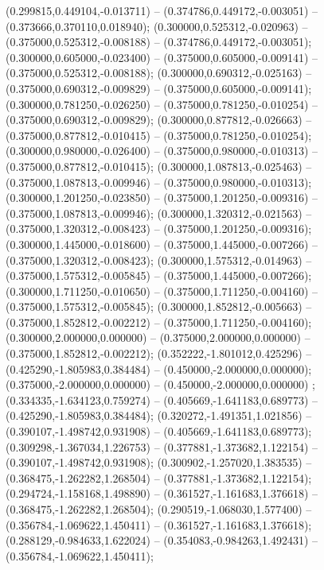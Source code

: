  (0.299815,0.449104,-0.013711) -- (0.374786,0.449172,-0.003051) -- (0.373666,0.370110,0.018940);
 (0.300000,0.525312,-0.020963) -- (0.375000,0.525312,-0.008188) -- (0.374786,0.449172,-0.003051);
 (0.300000,0.605000,-0.023400) -- (0.375000,0.605000,-0.009141) -- (0.375000,0.525312,-0.008188);
 (0.300000,0.690312,-0.025163) -- (0.375000,0.690312,-0.009829) -- (0.375000,0.605000,-0.009141);
 (0.300000,0.781250,-0.026250) -- (0.375000,0.781250,-0.010254) -- (0.375000,0.690312,-0.009829);
 (0.300000,0.877812,-0.026663) -- (0.375000,0.877812,-0.010415) -- (0.375000,0.781250,-0.010254);
 (0.300000,0.980000,-0.026400) -- (0.375000,0.980000,-0.010313) -- (0.375000,0.877812,-0.010415);
 (0.300000,1.087813,-0.025463) -- (0.375000,1.087813,-0.009946) -- (0.375000,0.980000,-0.010313);
 (0.300000,1.201250,-0.023850) -- (0.375000,1.201250,-0.009316) -- (0.375000,1.087813,-0.009946);
 (0.300000,1.320312,-0.021563) -- (0.375000,1.320312,-0.008423) -- (0.375000,1.201250,-0.009316);
 (0.300000,1.445000,-0.018600) -- (0.375000,1.445000,-0.007266) -- (0.375000,1.320312,-0.008423);
 (0.300000,1.575312,-0.014963) -- (0.375000,1.575312,-0.005845) -- (0.375000,1.445000,-0.007266);
 (0.300000,1.711250,-0.010650) -- (0.375000,1.711250,-0.004160) -- (0.375000,1.575312,-0.005845);
 (0.300000,1.852812,-0.005663) -- (0.375000,1.852812,-0.002212) -- (0.375000,1.711250,-0.004160);
 (0.300000,2.000000,0.000000) -- (0.375000,2.000000,0.000000) -- (0.375000,1.852812,-0.002212);
 (0.352222,-1.801012,0.425296) -- (0.425290,-1.805983,0.384484) -- (0.450000,-2.000000,0.000000);
 (0.375000,-2.000000,0.000000) -- (0.450000,-2.000000,0.000000) ;
 (0.334335,-1.634123,0.759274) -- (0.405669,-1.641183,0.689773) -- (0.425290,-1.805983,0.384484);
 (0.320272,-1.491351,1.021856) -- (0.390107,-1.498742,0.931908) -- (0.405669,-1.641183,0.689773);
 (0.309298,-1.367034,1.226753) -- (0.377881,-1.373682,1.122154) -- (0.390107,-1.498742,0.931908);
 (0.300902,-1.257020,1.383535) -- (0.368475,-1.262282,1.268504) -- (0.377881,-1.373682,1.122154);
 (0.294724,-1.158168,1.498890) -- (0.361527,-1.161683,1.376618) -- (0.368475,-1.262282,1.268504);
 (0.290519,-1.068030,1.577400) -- (0.356784,-1.069622,1.450411) -- (0.361527,-1.161683,1.376618);
 (0.288129,-0.984633,1.622024) -- (0.354083,-0.984263,1.492431) -- (0.356784,-1.069622,1.450411);
